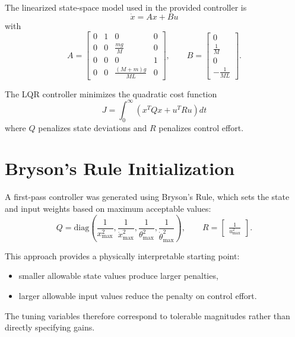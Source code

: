 \documentclass[11pt]{article}
\begin{document}
The linearized state-space model used in the provided controller is
\begin{equation}
    \dot{x} = Ax + Bu
\end{equation}
with
\begin{equation}
A =
\begin{bmatrix}
0 & 1 & 0 & 0\\
0 & 0 & \frac{mg}{M} & 0\\
0 & 0 & 0 & 1\\
0 & 0 & \frac{(M+m)g}{ML} & 0
\end{bmatrix},
\qquad
B =
\begin{bmatrix}
0\\
\frac{1}{M}\\
0\\
-\frac{1}{ML}
\end{bmatrix}.
\end{equation}

The LQR controller minimizes the quadratic cost function
\begin{equation}
    J = \int_0^\infty \left( x^TQx + u^TRu \right) dt
\end{equation}
where $Q$ penalizes state deviations and $R$ penalizes control effort.

\newpage
\section{Bryson's Rule Initialization}
A first-pass controller was generated using Bryson's Rule, which sets the state and input weights based on maximum acceptable values:
\begin{equation}
Q = \mathrm{diag}\left(
\frac{1}{x_{\max}^2},
\frac{1}{\dot{x}_{\max}^2},
\frac{1}{\theta_{\max}^2},
\frac{1}{\dot{\theta}_{\max}^2}
\right),
\qquad
R =
\begin{bmatrix}
\frac{1}{u_{\max}^2}
\end{bmatrix}.
\end{equation}

This approach provides a physically interpretable starting point:
\begin{itemize}[itemsep=2pt]
    \item smaller allowable state values produce larger penalties,
    \item larger allowable input values reduce the penalty on control effort.
\end{itemize}

The tuning variables therefore correspond to tolerable magnitudes rather than directly specifying gains.
\end{document}
